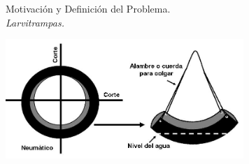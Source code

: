 \begin{frame}[t]{Motivación y Definición del Problema.\\\textit{Larvitrampas.}}
  \begin{center}
    \includegraphics[width=9cm]{../book/anexos/graphics/construccion-larvitrampa.png}
  \end{center}
\end{frame}

